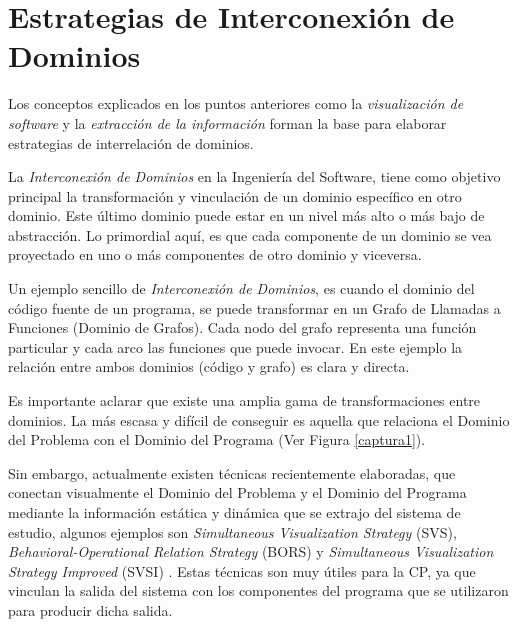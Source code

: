 \section{Estrategias de Interconexión de \\Dominios}

Los conceptos explicados en los puntos anteriores como la \textit{visualización de software} y la \textit{extracción de la información} forman la base para elaborar estrategias de interrelación de dominios.

La \textit{Interconexión de Dominios} en la Ingeniería del Software, tiene como objetivo principal la transformación y vinculación de un dominio específico en otro dominio. Este último dominio puede estar en un nivel más alto o más bajo de abstracción. Lo primordial aquí, es que cada componente de un dominio se vea proyectado en uno o más componentes de otro dominio y viceversa.


Un ejemplo sencillo de \textit{Interconexión de Dominios}, es cuando el dominio del código fuente de un programa, se puede transformar en un Grafo de Llamadas a Funciones (Dominio de Grafos). Cada nodo del grafo representa una función particular y cada arco las funciones que puede invocar. En este ejemplo la relación entre ambos dominios (código y grafo) es clara y directa. 

Es importante aclarar que existe una amplia gama de transformaciones entre dominios. La más escasa y difícil de conseguir es aquella que relaciona el Dominio del Problema con el Dominio del Programa (Ver Figura \ref{captura1}).

Sin embargo, actualmente existen técnicas recientemente elaboradas, que conectan visualmente el Dominio del Problema y el Dominio del Programa mediante la información estática y dinámica que se extrajo del sistema de estudio, algunos ejemplos son \textit{Simultaneous Visualization Strategy} (SVS), \textit{Behavioral-Operational Relation Strategy} (BORS) y \textit{Simultaneous Visualization Strategy Improved} (SVSI) \cite{BRM10,MPMR07,MBPHRU10}. Estas técnicas son muy útiles para la CP, ya que vinculan la salida del sistema con los componentes del programa que se utilizaron para producir dicha salida.

